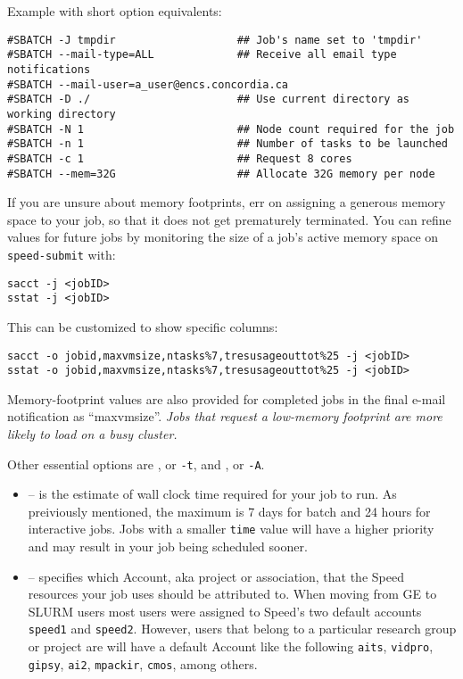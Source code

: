 Example with short option equivalents:

\begin{verbatim}
#SBATCH -J tmpdir                   ## Job's name set to 'tmpdir'
#SBATCH --mail-type=ALL             ## Receive all email type notifications
#SBATCH --mail-user=a_user@encs.concordia.ca 
#SBATCH -D ./                       ## Use current directory as working directory
#SBATCH -N 1                        ## Node count required for the job
#SBATCH -n 1                        ## Number of tasks to be launched
#SBATCH -c 1                        ## Request 8 cores
#SBATCH --mem=32G                   ## Allocate 32G memory per node 
\end{verbatim}

%
If you are unsure about memory footprints, err on assigning a generous
memory space to your job, so that it does not get prematurely terminated.
You can refine
values for future jobs by monitoring the size of a job's active
memory space on \texttt{speed-submit} with:


\begin{verbatim}
sacct -j <jobID>
sstat -j <jobID>
\end{verbatim}

\noindent
This can be customized to show specific columns:

\begin{verbatim}
sacct -o jobid,maxvmsize,ntasks%7,tresusageouttot%25 -j <jobID>
sstat -o jobid,maxvmsize,ntasks%7,tresusageouttot%25 -j <jobID>
\end{verbatim}

Memory-footprint values are also provided for completed jobs in the final
e-mail notification as ``maxvmsize''.
%
\emph{Jobs that request a low-memory footprint are more likely to load on a busy
cluster.}

Other essential options are , or \verb|-t|, and , or \verb|-A|.
%
\begin{itemize}
\item
{} -- is the estimate of wall clock time required for your job to run. 
As preiviously mentioned, the maximum is 7 days for batch and 24 hours for interactive jobs. 
Jobs with a smaller \texttt{time} value will have a higher priority and may result in your job being scheduled sooner. 

\item
{} -- specifies which Account, aka project or association, 
that the Speed resources your job uses should be attributed to. When moving from 
GE to SLURM users most users were assigned to Speed's two default accounts 
\texttt{speed1} and \texttt{speed2}. However, users that belong to a particular research
group or project are will have a default Account like the following
\texttt{aits},
\texttt{vidpro},
\texttt{gipsy},
\texttt{ai2},
\texttt{mpackir},
\texttt{cmos}, among others.

\end{itemize}